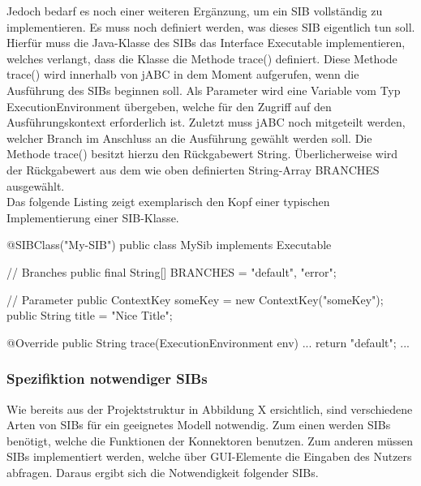 Jedoch bedarf es noch einer weiteren Ergänzung, um ein SIB vollständig zu implementieren. Es muss noch definiert werden, was dieses SIB eigentlich tun soll. Hierfür muss die Java-Klasse des SIBs das Interface Executable implementieren, welches verlangt, dass die Klasse die Methode trace() definiert. Diese Methode trace() wird innerhalb von jABC in dem Moment aufgerufen, wenn die Ausführung des SIBs beginnen soll. Als Parameter wird eine Variable vom Typ ExecutionEnvironment übergeben, welche für den Zugriff auf den Ausführungskontext erforderlich ist. Zuletzt muss jABC noch mitgeteilt werden, welcher Branch im Anschluss an die Ausführung gewählt werden soll. Die Methode trace() besitzt hierzu den Rückgabewert String. Überlicherweise wird der Rückgabewert aus dem wie oben definierten String-Array BRANCHES ausgewählt.\\

Das folgende Listing zeigt exemplarisch den Kopf einer typischen Implementierung einer SIB-Klasse.


@SIBClass("My-SIB")
public class MySib implements Executable {

	// Branches
    public final String[] BRANCHES = {"default", "error"};

    // Parameter
    public ContextKey someKey = new ContextKey("someKey");
    public String title = "Nice Title";

    @Override
    public String trace(ExecutionEnvironment env) {
        ...
		return "default";
    }
	...
}	


\subsubsection{Spezifiktion notwendiger SIBs}
Wie bereits aus der Projektstruktur in Abbildung X ersichtlich, sind verschiedene Arten von SIBs für ein geeignetes Modell notwendig. Zum einen werden SIBs benötigt, welche die Funktionen der Konnektoren benutzen. Zum anderen müssen SIBs implementiert werden, welche über GUI-Elemente die Eingaben des Nutzers abfragen. Daraus ergibt sich die Notwendigkeit folgender SIBs.\\

